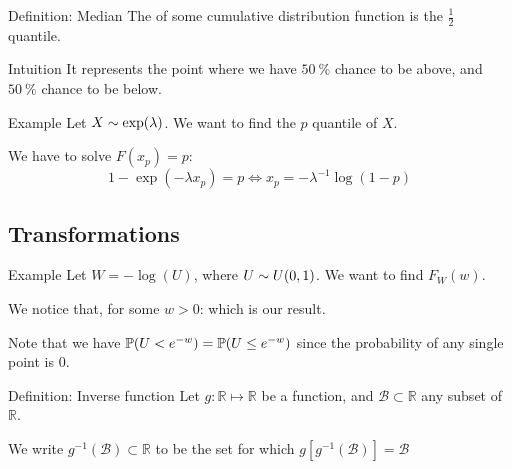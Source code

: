 \documentclass[a4paper]{article}
\begin{document}
\begin{parag}{Definition: Median}
    The  of some cumulative distribution function is the $\frac{1}{2}$ quantile.

    \begin{subparag}{Intuition}
        It represents the point where we have $\SI{50}{\%}$ chance to be above, and $\SI{50}{\percent}$ chance to be below.
    \end{subparag}
\end{parag}

\begin{parag}{Example}
    Let $X \followsdistr \exp\left(\lambda\right)$. We want to find the $p$ quantile of $X$.

    We have to solve $F\left(x_p\right) = p$: 
    \[1 - \exp\left(-\lambda x_p\right) = p \iff x_p = -\lambda^{-1} \log\left(1 - p\right)\]
\end{parag}

\subsection{Transformations}
\begin{parag}{Example}
    Let $W = -\log\left(U\right)$, where $U \followsdistr U\left(0, 1\right)$. We want to find $F_W\left(w\right)$.

    We notice that, for some $w > 0$: 
    which is our result.

    Note that we have $\prob\left(U < e^{-w}\right) = \prob\left(U \leq e^{-w}\right)$ since the probability of any single point is 0.
\end{parag}

\begin{parag}{Definition: Inverse function}
    Let $g: \mathbb{R}\mapsto \mathbb{R}$ be a function, and $\mathcal{B} \subset \mathbb{R}$ any subset of $\mathbb{R}$. 

    We write $g^{-1}\left(\mathcal{B}\right) \subset \mathbb{R}$ to be the set for which $g\left[g^{-1}\left(\mathcal{B}\right)\right] = \mathcal{B}$
\end{parag}
\end{document}
